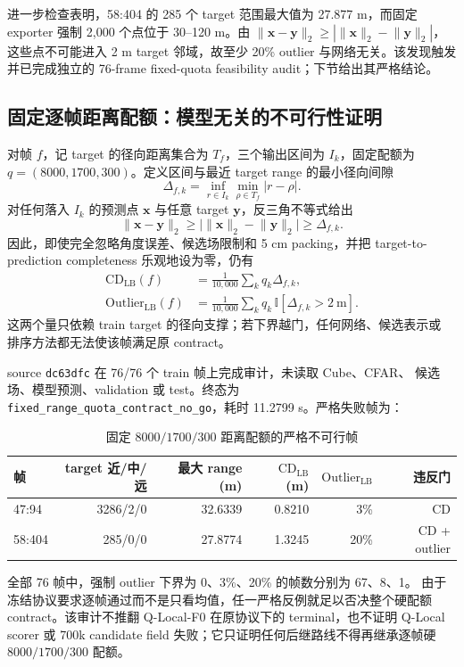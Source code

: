 \documentclass[11pt,a4paper,fontset=none]{ctexart}
\newcommand{\code}[1]{\texttt{#1}}
\begin{document}
进一步检查表明，58:404 的 285 个 target 范围最大值为 27.877 m，而固定 exporter
强制 2,000 个点位于 30--120 m。由
$\lVert\mathbf x-\mathbf y\rVert_2\ge
|\lVert\mathbf x\rVert_2-\lVert\mathbf y\rVert_2|$，这些点不可能进入 2 m target
邻域，故至少 20\% outlier 与网络无关。该发现触发并已完成独立的 76-frame
fixed-quota feasibility audit；下节给出其严格结论。

\subsection{固定逐帧距离配额：模型无关的不可行性证明}

对帧 $f$，记 target 的径向距离集合为 $T_f$，三个输出区间为 $I_k$，固定配额为
$q=(8000,1700,300)$。定义区间与最近 target range 的最小径向间隙
\begin{equation}
  \Delta_{f,k}=\inf_{r\in I_k}\min_{\rho\in T_f}|r-\rho|.
\end{equation}
对任何落入 $I_k$ 的预测点 $\mathbf x$ 与任意 target $\mathbf y$，反三角不等式给出
\begin{equation}
  \lVert\mathbf x-\mathbf y\rVert_2
  \ge \bigl|\lVert\mathbf x\rVert_2-\lVert\mathbf y\rVert_2\bigr|
  \ge \Delta_{f,k}.
\end{equation}
因此，即使完全忽略角度误差、候选场限制和 5 cm packing，并把 target-to-prediction
completeness 乐观地设为零，仍有
\begin{align}
  \mathrm{CD}_{\mathrm{LB}}(f)
  &=\frac{1}{10{,}000}\sum_k q_k\Delta_{f,k},\\
  \mathrm{Outlier}_{\mathrm{LB}}(f)
  &=\frac{1}{10{,}000}\sum_k q_k\,\mathbb I[\Delta_{f,k}>2\ \mathrm m].
\end{align}
这两个量只依赖 train target 的径向支撑；若下界越门，任何网络、候选表示或
排序方法都无法使该帧满足原 contract。

source \code{dc63dfc} 在 76/76 个 train 帧上完成审计，未读取 Cube、CFAR、
候选场、模型预测、validation 或 test。终态为
\code{fixed\_range\_quota\_contract\_no\_go}，耗时 11.2799 s。严格失败帧为：
\begin{table}[H]
\centering
\small
\caption{固定 $8000/1700/300$ 距离配额的严格不可行帧}
\begin{tabular}{lrrrrr}
\toprule
帧 & target 近/中/远 & 最大 range (m) & $\mathrm{CD}_{\mathrm{LB}}$ (m) & $\mathrm{Outlier}_{\mathrm{LB}}$ & 违反门 \\
\midrule
47:94 & 3286/2/0 & 32.6339 & 0.8210 & 3\% & CD \\
58:404 & 285/0/0 & 27.8774 & 1.3245 & 20\% & CD + outlier \\
\bottomrule
\end{tabular}
\end{table}
全部 76 帧中，强制 outlier 下界为 0、3\%、20\% 的帧数分别为 67、8、1。
由于冻结协议要求逐帧通过而不是只看均值，任一严格反例就足以否决整个硬配额
contract。该审计不推翻 Q-Local-F0 在原协议下的 terminal，也不证明 Q-Local
scorer 或 700k candidate field 失败；它只证明任何后继路线不得再继承逐帧硬
$8000/1700/300$ 配额。
\end{document}
